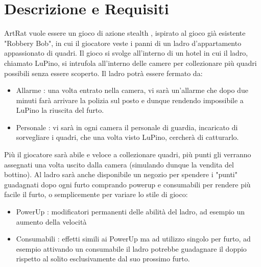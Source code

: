 \documentclass[a4paper,12pt]{report}
\begin{document}
\section{Descrizione e Requisiti}
ArtRat vuole essere un gioco di azione stealth , ispirato al gioco già esistente "Robbery Bob", in cui il giocatore veste i panni di un ladro d'appartamento appassionato di quadri.
Il gioco si svolge all'interno di un hotel in cui il ladro, chiamato LuPino, si intrufola all'interno delle camere per collezionare più quadri possibili senza essere scoperto.
Il ladro potrà essere fermato da:
\begin{itemize}
    \item Allarme : una volta entrato nella camera, vi sarà un'allarme che dopo due minuti farà arrivare la polizia sul posto e dunque rendendo impossibile a LuPino la riuscita del furto.
    \item Personale : vi sarà in ogni camera il personale di guardia, incaricato di sorvegliare i quadri, che una volta visto LuPino, cercherà di catturarlo.
\end{itemize}
Più il giocatore sarà abile e veloce a collezionare quadri, più punti gli verranno assegnati una volta uscito dalla camera (simulando dunque la vendita del bottino). 
Al ladro sarà anche disponibile un negozio per spendere i "punti" guadagnati dopo ogni furto comprando powerup e consumabili per rendere più facile il furto, o semplicemente per variare lo stile di gioco:
\begin{itemize}
    \item PowerUp : modificatori permanenti delle abilità del ladro, ad esempio un aumento della velocità
    \item Consumabili : effetti simili ai PowerUp ma ad utilizzo singolo per furto, ad esempio attivando un consumabile il ladro potrebbe guadagnare il doppio rispetto al solito esclusivamente dal suo prossimo furto.
\end{itemize}
\end{document}
